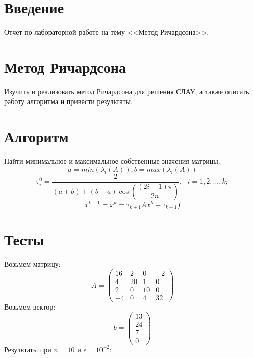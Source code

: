 \documentclass[14pt, titlepage,fleqn]{extarticle}
\begin{document}
	

	
	
	\newpage
	
	\tableofcontents   
	\clearpage
	\section*{Введение}
	Отчёт по лабораторной работе на тему <<Метод Ричардсона>>.	
	\newpage









	\section*{Метод Ричардсона}
	Изучить и реализовать метод Ричардсона для решения СЛАУ, а также описать работу алгоритма и
	привести результаты.

	\section*{Алгоритм}
	Найти минимальное и максимальное собственные значения матрицы:
	\[a = min(\lambda_i(A)), b = max(\lambda_i(A))\]	
	\[\tau^{0}_i = \dfrac{2}{(a + b) + (b-a)\cos\left(\dfrac{(2i-1)\pi}{2n}\right)},~~~i=1,2,...,k; \]
	\[x^{k+1} = x^k = \tau_{k+1}Ax^k + \tau_{k+1}f\]
	\section*{Тесты}
	Возьмем матрицу:
	\[A = \begin{pmatrix}
		16& 2& 0& -2\\
        4& 20& 1& 0\\
        2& 0& 10& 0\\
        -4& 0& 4& 32
	\end{pmatrix}\]
	Возьмем вектор:
	\[b =\begin{pmatrix}
		13\\
		24\\
		7\\
		0
	\end{pmatrix} \]
	\newpage
	Результаты при $n=10$ и $\epsilon = 10^{-2}$:
	\begin{figure}[H]
	\end{figure}
\end{document}
